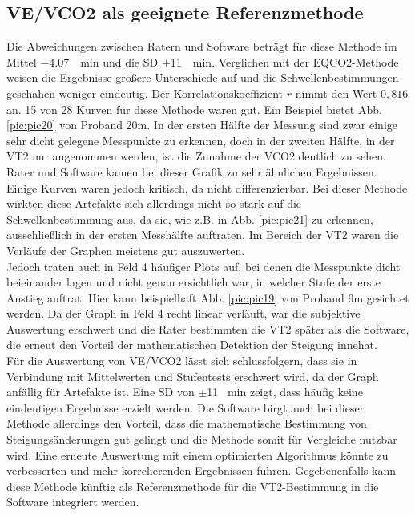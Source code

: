 \subsection{\acs{VE}/\acs{VCO2} als geeignete Referenzmethode}
%
Die Abweichungen zwischen Ratern und Software beträgt für diese Methode im Mittel \SI{-4,07}{\per\minute} und die \acs{SD} $\pm$\SI{11}{\per\minute}. Verglichen mit der \acs{EQCO2}-Methode weisen die Ergebnisse größere Unterschiede auf und die Schwellenbestimmungen geschahen weniger eindeutig. Der Korrelationskoeffizient $r$ nimmt den Wert $0,816$ an. 15 von 28 Kurven für diese Methode waren gut. Ein Beispiel bietet Abb. \ref{pic:pic20} von Proband 20m. In der ersten Hälfte der Messung sind zwar einige sehr dicht gelegene Messpunkte zu erkennen, doch in der zweiten Hälfte, in der VT2 nur angenommen werden, ist die Zunahme der \acs{VCO2} deutlich zu sehen. Rater und Software kamen bei dieser Grafik zu sehr ähnlichen Ergebnissen.\\
Einige Kurven waren jedoch kritisch, da nicht differenzierbar. Bei dieser Methode wirkten diese Artefakte sich allerdings nicht so stark auf die Schwellenbestimmung aus, da sie, wie z.B. in Abb. \ref{pic:pic21} zu erkennen, ausschließlich in der ersten Messhälfte auftraten. Im Bereich der VT2 waren die Verläufe der Graphen meistens gut auszuwerten.\\
Jedoch traten auch in Feld 4 häufiger Plots auf, bei denen die Messpunkte dicht beieinander lagen und nicht genau ersichtlich war, in welcher Stufe der erste Anstieg auftrat. Hier kann beispielhaft Abb. \ref{pic:pic19} von Proband 9m gesichtet werden. Da der Graph in Feld 4 recht linear verläuft, war die subjektive Auswertung erschwert und die Rater bestimmten die VT2 später als die Software, die erneut den Vorteil der mathematischen Detektion der Steigung innehat.\\
Für die Auswertung von \acs{VE}/\acs{VCO2} lässt sich schlussfolgern, dass sie in Verbindung mit Mittelwerten und Stufentests erschwert wird, da der Graph anfällig für Artefakte ist. Eine \acs{SD} von $\pm$11 \si{\per\minute} zeigt, dass häufig keine eindeutigen Ergebnisse erzielt werden. Die Software birgt auch bei dieser Methode allerdings den Vorteil, dass die mathematische Bestimmung von Steigungsänderungen gut gelingt und die Methode somit für Vergleiche nutzbar wird. Eine erneute Auswertung mit einem optimierten Algorithmus könnte zu verbesserten und mehr korrelierenden Ergebnissen führen. Gegebenenfalls kann diese Methode künftig als Referenzmethode für die VT2-Bestimmung in die Software integriert werden.
%

